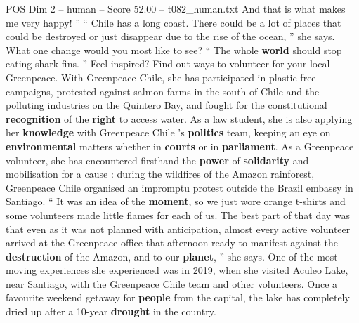 \begin{textsample}{POS Dim 2 – human – Score 52.00 – t082\_human.txt}
And that is what makes me very happy! ” “ Chile has a long coast.
There could be a lot of places that could be destroyed or just disappear due to the rise of the ocean, ” she says.
What one change would you most like to see? “ The whole \textbf{world} should stop eating shark fins. ” Feel inspired?
Find out ways to volunteer for your local Greenpeace.
With Greenpeace Chile, she has participated in plastic-free campaigns, protested against salmon farms in the south of Chile and the polluting industries on the Quintero Bay, and fought for the constitutional \textbf{recognition} of the \textbf{right} to access water.
As a law student, she is also applying her \textbf{knowledge} with Greenpeace Chile ’s \textbf{politics} team, keeping an eye on \textbf{environmental} matters whether in \textbf{courts} or in \textbf{parliament}.
As a Greenpeace volunteer, she has encountered firsthand the \textbf{power} of \textbf{solidarity} and mobilisation for a cause : during the wildfires of the Amazon rainforest, Greenpeace Chile organised an impromptu protest outside the Brazil embassy in Santiago. “ It was an idea of the \textbf{moment}, so we just wore orange t-shirts and some volunteers made little flames for each of us.
The best part of that day was that even as it was not planned with anticipation, almost every active volunteer arrived at the Greenpeace office that afternoon ready to manifest against the \textbf{destruction} of the Amazon, and to our \textbf{planet}, ” she says.
One of the most moving experiences she experienced was in 2019, when she visited Aculeo Lake, near Santiago, with the Greenpeace Chile team and other volunteers.
Once a favourite weekend getaway for \textbf{people} from the capital, the lake has completely dried up after a 10-year \textbf{drought} in the country.

\end{textsample}

